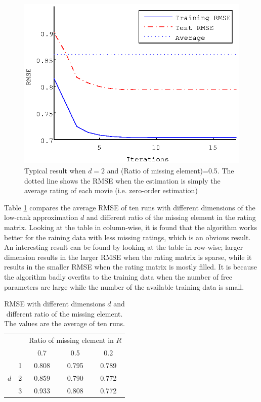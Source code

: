 \documentclass{article}
\begin{document}
\begin{figure}[ht]
  \begin{center}
    \includegraphics[scale=0.6]{figure/lrem_typical_plot.eps}
  \end{center}
  \caption{Typical result when $d = 2$ and (Ratio of missing element)=0.5. The dotted line shows the RMSE when the estimation is simply the average rating of each movie (i.e. zero-order estimation)}
  \label{fig:lrem_typical_plot.eps}
\end{figure}

Table \ref{table:lrem_result} compares the average RMSE of ten runs with different dimensions of the low-rank approximation $d$ and different ratio of the missing element in the rating matrix. Looking at the table in column-wise, it is found that the algorithm works better for the raining data with less missing ratings, which is an obvious result. An interesting result can be found by looking at the table in row-wise; larger dimension results in the larger RMSE when the rating matrix is sparse, while it results in the smaller RMSE when the rating matrix is mostly filled. It is because the algorithm badly overfits to the training data when the number of free parameters are large while the number of the available training data is small. 


\begin{table}[ht]
 \caption{RMSE with different dimensions $d$ and different ratio of the missing element. The values are the average of ten runs.}
 \label{table:lrem_result}
 \begin{center}
  \begin{tabular}{|c|c||c|c|c|}
    \hline
    \multicolumn{2}{|c|}{}  & \multicolumn{3}{|c|}{Ratio of missing element in $R$} \\
    \cline{3-5}
     \multicolumn{2}{|c|}{}    &  0.7  &  0.5  & 0.2   \\
    \hline
    \hline
       & 1 &  0.808  &  0.795  &  0.789  \\
    \cline{2-5}
     $d$ & 2 &  0.859  &  0.790  & 0.772   \\
    \cline{2-5}
     & 3 &  0.933  &  0.808  &  0.772  \\
    \hline
  \end{tabular}
 \end{center}
\end{table}
\end{document}

